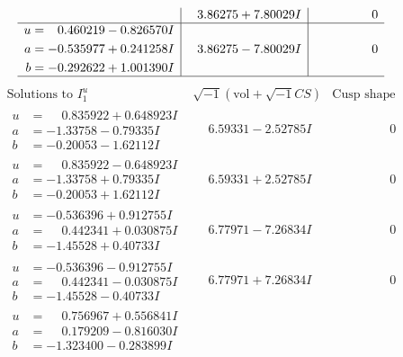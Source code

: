 \documentclass[1p]{elsarticle_modified}
\theoremstyle{definition}
\newcommand{\I}{\sqrt{-1}}
\begin{document}
$$\begin{array}{c|c|c}
 & \phantom{-}3.86275 + 7.80029 I & \phantom{-0.000000 } 0 \\ \hline\begin{aligned}
u &= \phantom{-}0.460219 - 0.826570 I \\
a &= -0.535977 + 0.241258 I \\
b &= -0.292622 + 1.001390 I\end{aligned}
 & \phantom{-}3.86275 - 7.80029 I & \phantom{-0.000000 } 0\\
 \hline 
 \end{array}$$\newpage$$\begin{array}{c|c|c}  
\text{Solutions to }I^u_{1}& \I (\text{vol} + \sqrt{-1}CS) & \text{Cusp shape}\\
 \hline 
\begin{aligned}
u &= \phantom{-}0.835922 + 0.648923 I \\
a &= -1.33758 - 0.79335 I \\
b &= -0.20053 - 1.62112 I\end{aligned}
 & \phantom{-}6.59331 - 2.52785 I & \phantom{-0.000000 } 0 \\ \hline\begin{aligned}
u &= \phantom{-}0.835922 - 0.648923 I \\
a &= -1.33758 + 0.79335 I \\
b &= -0.20053 + 1.62112 I\end{aligned}
 & \phantom{-}6.59331 + 2.52785 I & \phantom{-0.000000 } 0 \\ \hline\begin{aligned}
u &= -0.536396 + 0.912755 I \\
a &= \phantom{-}0.442341 + 0.030875 I \\
b &= -1.45528 + 0.40733 I\end{aligned}
 & \phantom{-}6.77971 - 7.26834 I & \phantom{-0.000000 } 0 \\ \hline\begin{aligned}
u &= -0.536396 - 0.912755 I \\
a &= \phantom{-}0.442341 - 0.030875 I \\
b &= -1.45528 - 0.40733 I\end{aligned}
 & \phantom{-}6.77971 + 7.26834 I & \phantom{-0.000000 } 0 \\ \hline\begin{aligned}
u &= \phantom{-}0.756967 + 0.556841 I \\
a &= \phantom{-}0.179209 - 0.816030 I \\
b &= -1.323400 - 0.283899 I\end{aligned}

\end{array}$$
\end{document}
